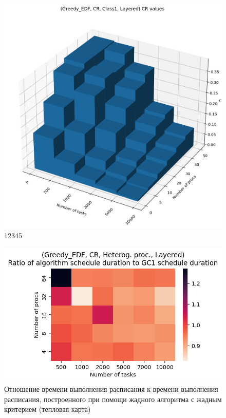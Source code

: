 \begin{figure}[!htbp]
    \centering
    \includegraphics[width=\textwidth]{imgs/layered_class_1/CR_EDF/cr_3d.png}
    \caption{12345}
\end{figure}

\begin{figure}
    \centering
    \includegraphics[width=\textwidth]{imgs/unbalanced/CR_EDF/times.png}
    \caption{Отношение времени выполнения расписания к времени выполнения расписания, построенного при помощи жадного алгоритма с жадным критерием (тепловая карта)}
    \label{fig:CR-disbalaned-EDF-times-heatmap}
\end{figure}

